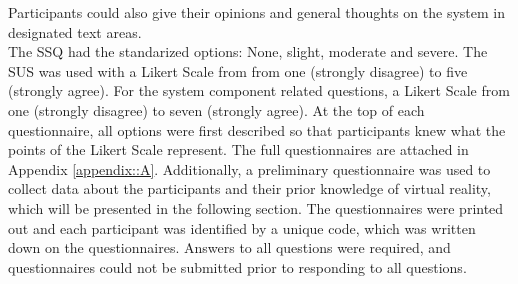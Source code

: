 Participants could also give their opinions and general thoughts on the system in designated text areas.
\\ The SSQ had the standarized options: None, slight, moderate and severe.
The SUS was used with a Likert Scale from from one (strongly disagree) to five (strongly agree).
For the system component related questions, a Likert Scale from one (strongly disagree) to seven (strongly agree).
At the top of each questionnaire, all options were first described so that participants knew what the points of the Likert Scale represent.
The full questionnaires are attached in Appendix \ref{appendix::A}.
Additionally, a preliminary questionnaire was used to collect data about the participants and their prior knowledge of virtual reality, which will be presented in the following section.
The questionnaires were printed out and each participant was identified by a unique code, which was written down on the questionnaires.
Answers to all questions were required, and questionnaires could not be submitted prior to responding to all questions.